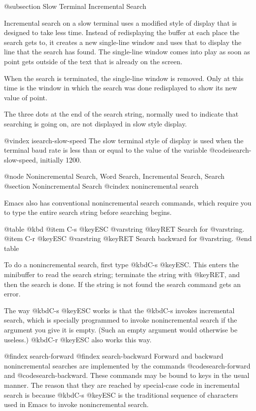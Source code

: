 {{{{{{{@subsection Slow Terminal Incremental Search

  Incremental search on a slow terminal uses a modified style of display
that is designed to take less time.  Instead of redisplaying the buffer at
each place the search gets to, it creates a new single-line window and uses
that to display the line that the search has found.  The single-line window
comes into play as soon as point gets outside of the text that is already
on the screen.

  When the search is terminated, the single-line window is removed.  Only
at this time is the window in which the search was done redisplayed to show
its new value of point.

  The three dots at the end of the search string, normally used to indicate
that searching is going on, are not displayed in slow style display.

@vindex isearch-slow-speed
  The slow terminal style of display is used when the terminal baud rate is
less than or equal to the value of the variable @code{isearch-slow-speed},
initially 1200.

@node Nonincremental Search, Word Search, Incremental Search, Search
@section Nonincremental Search
@cindex nonincremental search

  Emacs also has conventional nonincremental search commands, which require
you to type the entire search string before searching begins.

@table @kbd
@item C-s @key{ESC} @var{string} @key{RET}
Search for @var{string}.
@item C-r @key{ESC} @var{string} @key{RET}
Search backward for @var{string}.
@end table

  To do a nonincremental search, first type @kbd{C-s @key{ESC}}.  This
enters the minibuffer to read the search string; terminate the string with
@key{RET}, and then the search is done.  If the string is not found the
search command gets an error.

  The way @kbd{C-s @key{ESC}} works is that the @kbd{C-s} invokes
incremental search, which is specially programmed to invoke nonincremental
search if the argument you give it is empty.  (Such an empty argument would
otherwise be useless.)  @kbd{C-r @key{ESC}} also works this way.

@findex search-forward
@findex search-backward
  Forward and backward nonincremental searches are implemented by the
commands @code{search-forward} and @code{search-backward}.  These commands
may be bound to keys in the usual manner.  The reason that they are reached
by special-case code in incremental search is because @kbd{C-s @key{ESC}}
is the traditional sequence of characters used in Emacs to invoke
nonincremental search.

}}}}}}}
